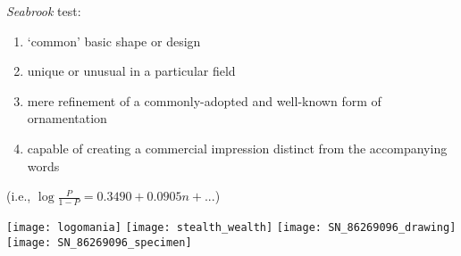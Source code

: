 \documentclass[aspectratio = 1610]{beamer}
\begin{document}
\begin{frame}

\textit{Seabrook} test:

\begin{enumerate}

\item `common' basic shape or design
\item unique or unusual in a particular field
\item mere refinement of a commonly-adopted and well-known form of ornamentation
\item capable of creating a commercial impression distinct from the accompanying words \

\end{enumerate}

\vspace{1cm}



\vspace{0.5cm}

\centering

(i.e., $\log{\frac{P}{1-P}}=0.3490+0.0905n+...$)

\end{frame}

\begin{frame}

\centering

\texttt{[image: logomania]}
\texttt{[image: stealth\_wealth]}
\texttt{[image: SN\_86269096\_drawing]}
\texttt{[image: SN\_86269096\_specimen]}

\end{frame}
\end{document}
